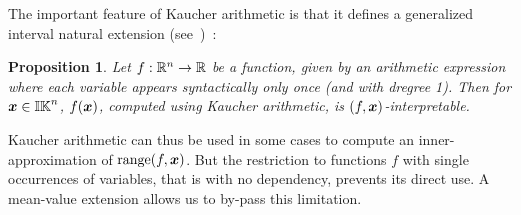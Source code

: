\documentclass{sig-alternate-05-2015}
\newtheorem{proposition}{Proposition}
\DeclareMathOperator{\range}{range}
\def\bbr{{\Bbb R}}
\def\K{{\Bbb I \Bbb K}}
\begin{document}
The important feature of Kaucher arithmetic is that it defines a generalized interval natural extension (see~\cite{gold1})~:
\begin{proposition}
\label{prop1}
Let $f : \bbr^n \rightarrow \bbr$ be a function, given by an arithmetic expression where each variable appears syntactically only once (and with dregree 1).
Then for $\x \in \K^n$, $f(\x)$, computed using Kaucher arithmetic, is $(f,\x)$-interpretable.
\end{proposition}
Kaucher arithmetic can thus be used in some cases to compute an inner-approximation of $\range(f,\x)$.
But the restriction to functions $f$ with single occurrences of variables, 
that is with no dependency, prevents its direct use. A mean-value extension allows us to by-pass this limitation.
\end{document}

